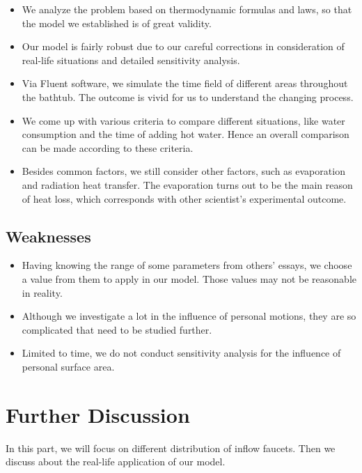 \documentclass{mcmthesis}
\begin{document}
\begin{itemize}
\item We analyze the problem based on thermodynamic formulas and laws, so that the model we established is of great validity.

\item Our model is fairly robust due to our careful corrections in consideration of real-life situations and detailed sensitivity analysis.

\item Via Fluent software, we simulate the time field of different areas throughout the bathtub. The outcome is vivid for us to understand the changing process.

\item We come up with various criteria to compare different situations, like water consumption and the time of adding hot water. Hence an overall comparison can be made according to these criteria.

\item Besides common factors, we still consider other factors, such as evaporation and radiation heat transfer. The evaporation turns out to be the main reason of heat loss, which corresponds with other scientist’s experimental outcome.
\end{itemize}

\subsection{Weaknesses}

\begin{itemize}
\item Having knowing the range of some parameters from others’ essays, we choose a value from them to apply in our model. Those values may not be reasonable in reality.

\item Although we investigate a lot in the influence of personal motions, they are so complicated that need to be studied further.

\item Limited to time, we do not conduct sensitivity analysis for the influence of personal surface area.
\end{itemize}

\section{Further Discussion}

In this part, we will focus on different distribution of inflow faucets. Then we discuss about the real-life application of our model.
\end{document}

